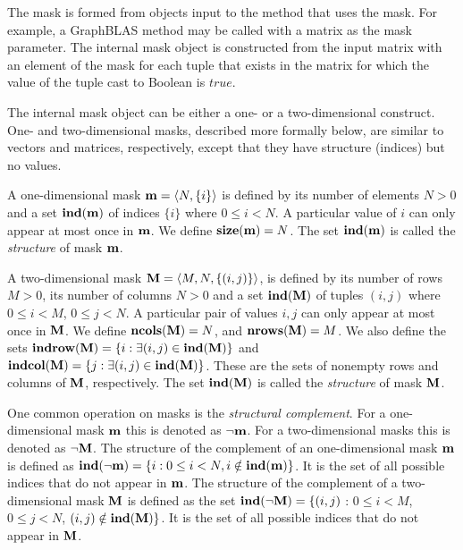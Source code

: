 The mask is formed from objects input to the method that uses 
the mask.  For example, a GraphBLAS method may be called with a matrix as the mask
parameter.   The internal mask object is constructed from the input matrix with an element of the 
mask for each tuple that exists in the matrix for which the value of the tuple 
cast to Boolean is $true$.

The internal mask object can be either a one- or a two-dimensional construct.  One- and
two-dimensional masks, described more formally below, are similar to
vectors and matrices, respectively, except that they have structure
(indices) but no values.  

A one-dimensional mask ${\bf m} = \langle N, \{ i \} \rangle$ is
defined by its number of elements $N>0$ and a set $\bold{ind}({\bf m})$
of indices $\{ i \}$ where $0 \leq i < N$.  A particular value of $i$ can
only appear at most once in ${\bf m}$. We define $\bold{size}({\bf m})
= N$. The set $\bold{ind}({\bf m})$ is called the \emph{structure} of mask ${\bf m}$.

A two-dimensional mask ${\bf M} = \langle M, N, \{ (i,j) \}
\rangle$, is defined by its number of rows $M>0$, its number of
columns $N>0$ and a set $\bold{ind}({\bf M})$ of tuples $(i,j)$
where $0 \leq i < M$, $0 \leq j < N$.   A particular pair of values
$i,j$ can only appear at most once in ${\bf M}$.  We define
$\bold{ncols}({\bf M}) = N$, and $\bold{nrows}({\bf M}) = M$.
We also define the sets ${\bf indrow({\bf M})} = \{ i : \exists
(i,j) \in \bold{ind}({\bf M}) \}$ and ${\bf indcol({\bf M})}
= \{ j : \exists (i,j) \in \bold{ind}({\bf M}) \}$.  These are
the sets of nonempty rows and columns of ${\bf M}$, respectively.
The set $\bold{ind}({\bf M})$ is called the \emph{structure} of mask ${\bf M}$.

One common operation on masks is the \emph{structural complement}.
For a one-dimensional mask ${\bf m}$ this is denoted as
$\neg{\bf m}$. For a two-dimensional masks this is denoted as
$\neg{\bf M}$.  The structure of the complement of an one-dimensional
mask ${\bf m}$ is defined as $\bold{ind}(\neg{\bf m}) = \{i : 0
\leq i < N, i \notin \bold{ind}({\bf m}) \}$.  It is the set of all
possible indices that do not appear in ${\bf m}$.  The structure
of the complement of a two-dimensional mask ${\bf M}$ is defined as the set
$\bold{ind}(\neg{\bf M}) = \{(i,j)$ : $0 \leq i < M$, $0 \leq j < N$,
$(i,j) \notin \bold{ind}({\bf M}) \}$.  It is the set of all possible
indices that do not appear in ${\bf M}$.

